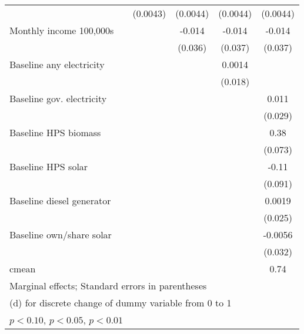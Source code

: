 \begin{table}[htbp]
\begin{tabular*}{1\hsize}{@{\hskip\tabcolsep\extracolsep\fill}l*{5}{c}}
                &                  & (0.0043)         & (0.0044)         & (0.0044)         & (0.0044)         \\
Monthly income 100,000s&                  &                  &   -0.014         &   -0.014         &   -0.014         \\
                &                  &                  &  (0.036)         &  (0.037)         &  (0.037)         \\
Baseline any electricity&                  &                  &                  &   0.0014         &                  \\
                &                  &                  &                  &  (0.018)         &                  \\
Baseline gov. electricity&                  &                  &                  &                  &    0.011         \\
                &                  &                  &                  &                  &  (0.029)         \\
Baseline HPS biomass&                  &                  &                  &                  &     0.38\sym{***}\\
                &                  &                  &                  &                  &  (0.073)         \\
Baseline HPS solar&                  &                  &                  &                  &    -0.11         \\
                &                  &                  &                  &                  &  (0.091)         \\
Baseline diesel generator&                  &                  &                  &                  &   0.0019         \\
                &                  &                  &                  &                  &  (0.025)         \\
Baseline own/share solar&                  &                  &                  &                  &  -0.0056         \\
                &                  &                  &                  &                  &  (0.032)         \\
\midrule
cmean           &                  &                  &                  &                  &     0.74         \\
\bottomrule
\multicolumn{6}{l}{\footnotesize Marginal effects; Standard errors in parentheses}\\
\multicolumn{6}{l}{\footnotesize  (d) for discrete change of dummy variable from 0 to 1}\\
\multicolumn{6}{l}{\footnotesize \sym{*} \(p<0.10\), \sym{**} \(p<0.05\), \sym{***} \(p<0.01\)}\\
\end{tabular*}
\end{table}
